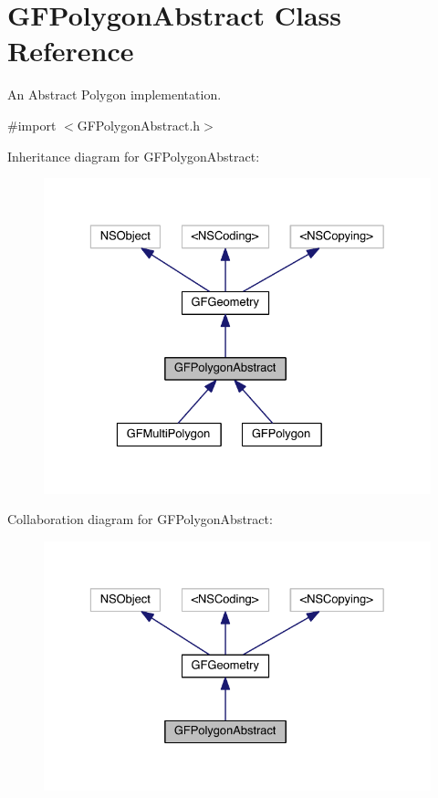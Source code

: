 \hypertarget{interface_g_f_polygon_abstract}{}\section{G\+F\+Polygon\+Abstract Class Reference}
\label{interface_g_f_polygon_abstract}


An Abstract Polygon implementation.  




{\ttfamily \#import $<$G\+F\+Polygon\+Abstract.\+h$>$}



Inheritance diagram for G\+F\+Polygon\+Abstract\+:\nopagebreak
\begin{figure}[H]
\begin{center}
\leavevmode
\includegraphics[width=329pt]{interface_g_f_polygon_abstract__inherit__graph}
\end{center}
\end{figure}


Collaboration diagram for G\+F\+Polygon\+Abstract\+:\nopagebreak
\begin{figure}[H]
\begin{center}
\leavevmode
\includegraphics[width=329pt]{interface_g_f_polygon_abstract__coll__graph}
\end{center}
\end{figure}
